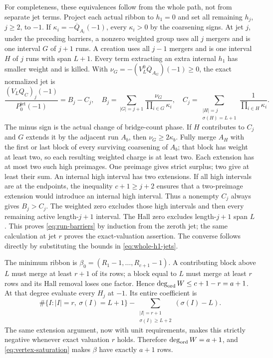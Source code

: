 \documentclass[11pt,a4paper]{amsart}
\numberwithin{equation}{section}
\theoremstyle{plain}
\theoremstyle{definition}
\begin{document}
For completeness, these equivalences follow from the whole path, not
from separate jet terms.  Project each actual ribbon to \(h_1=0\) and set all
remaining \(h_j\), \(j\ge2\), to \(-1\).  If
\(\kappa_i=-\overline{Q}_{A_i}(-1)\), every \(\kappa_i>0\) by the coarsening
signs.  At jet \(j\), under the preceding barriers, a nonzero weighted group
uses all \(j\) mergers and is one interval \(G\) of \(j+1\) runs.  A creation
uses all \(j-1\) mergers and is one interval \(H\) of \(j\) runs with span
\(L+1\).  Every term extracting an extra internal \(h_1\) has smaller weight
and is killed.  With
\(\nu_G=-(V_L^0\overline{Q}_{A_G})(-1)\ge0\), the exact normalized jet is
\begin{equation}\label{eq:path-surplus}
 \frac{(V_LQ_C)_j(-1)}{P^{\mathrm{jet}}_0(-1)}=B_j-C_j,
 \quad
 B_j=\sum_{|G|=j+1}\frac{\nu_G}{\prod_{i\in G}\kappa_i},
 \quad
 C_j=\sum_{\substack{|H|=j\\\sigma(H)=L+1}}
                         \frac1{\prod_{i\in H}\kappa_i}.
\end{equation}
The minus sign is the actual change of bridge-count phase.
If \(H\) contributes to \(C_j\) and \(G\) extends it by the adjacent run \(A_b\),
then \(\nu_G\ge2\kappa_b\).  Fully merge \(A_H\) with the first or last block
of every surviving coarsening of \(A_b\); that block has weight at least
two, so each resulting weighted charge is at least two.  Each extension
has at most two such high preimages.  One preimage gives strict surplus;
two give at least their sum.  An internal high interval has two extensions.
If all high intervals are at the endpoints, the inequality
\(c+1\ge j+2\) ensures that a two-preimage extension would introduce an
internal high interval.  Thus a nonempty \(C_j\) always gives \(B_j>C_j\).
The weighted zero excludes those high intervals and then every remaining
active length-\(j+1\) interval.  The Hall zero excludes length-\(j+1\) span
\(L\).  This proves \eqref{eq:run-barriers} by induction from the zeroth jet;
the same calculation at jet \(r\) proves the exact-valuation assertion.
The converse follows directly by substituting the bounds in
\eqref{eq:whole-h1-jets}.

The minimum ribbon is
\(\beta_0=(R_1-1,\ldots,R_{c+1}-1)\).  A contributing block above \(L\) must
merge at least \(r+1\) of its rows; a block equal to \(L\) must merge at least
\(r\) rows and its Hall removal loses one factor.  Hence
\(\deg_{\rm ord}W\le c+1-r=a+1\).
At that degree evaluate every \(H_j\) at \(-1\).  Its entire coefficient is
\[
 \#\{I:|I|=r,\ \sigma(I)=L+1\}
 -\sum_{\substack{|I|=r+1\\\sigma(I)\ge L+2}}(\sigma(I)-L).
\]
The same extension argument, now with unit requirements, makes this
strictly negative whenever exact valuation \(r\) holds.  Therefore
\(\deg_{\rm ord}W=a+1\), and \eqref{eq:vertex-saturation} makes
\(\beta\) have exactly \(a+1\) rows.
\end{document}
